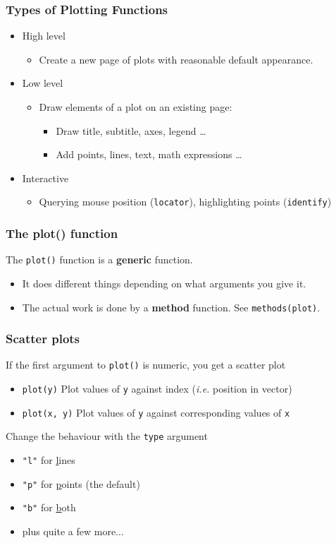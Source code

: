 \documentclass[xcolor=svgnames]{beamer}
\newcommand{\code}[1]{\texttt{#1}}
\begin{document}
\begin{frame}
  \frametitle{Types of Plotting Functions}
  \begin{itemize}
  \item High level
    \begin{itemize}
      \item Create a new page of plots with reasonable default appearance.
    \end{itemize}
  \item Low level
    \begin{itemize}
      \item Draw elements of a plot on an existing page:
        \begin{itemize}
        \item Draw title, subtitle, axes, legend \dots
        \item Add points, lines, text, math expressions \dots
        \end{itemize}
    \end{itemize}
  \item Interactive
    \begin{itemize}
    \item Querying mouse position (\code{locator}), highlighting
      points (\code{identify})
    \end{itemize}
  \end{itemize}
\end{frame}

\begin{frame}
  \frametitle{The plot() function}

  The \texttt{plot()} function is a {\bf generic} function.
  \begin{itemize}
  \item It does different things depending on what arguments you give it.
  \item The actual work is done by a {\bf method} function. See \texttt{methods(plot)}.
  \end{itemize}

\end{frame}

\begin{frame}
  \frametitle{Scatter plots}

  If the first argument to \code{plot()} is numeric, you get a scatter plot
  \begin{itemize}
  \item \code{plot(y)} Plot values of \code{y} against index ({\em i.e.} position in vector)
  \item \code{plot(x, y)} Plot values of \code{y} against corresponding values of \code{x}
  \end{itemize}
  Change the behaviour with the \code{type} argument
  \begin{itemize}
  \item \code{"l"} for \underline{l}ines
  \item \code{"p"} for \underline{p}oints (the default)
  \item \code{"b"} for \underline{b}oth
  \item plus  quite a few more...
  \end{itemize}
\end{frame}
\end{document}
